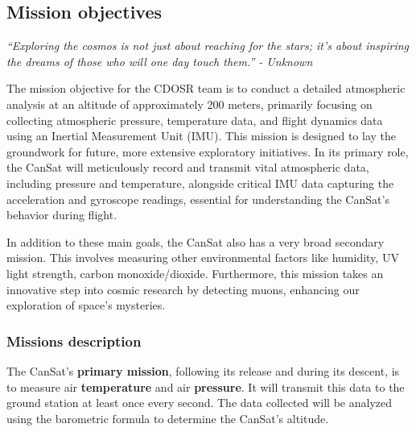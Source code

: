\subsection{Mission objectives}

{\textit{“Exploring the cosmos is not just about reaching for the stars; it's about inspiring the dreams of those who will one day touch them.” - Unknown}}
\vspace{0.5cm}

The mission objective for the CDOSR team is to conduct a detailed atmospheric analysis at an altitude of approximately 200 meters, primarily focusing on collecting atmospheric pressure, temperature data, and flight dynamics data using an Inertial Measurement Unit (IMU). This mission is designed to lay the groundwork for future, more extensive exploratory initiatives. In its primary role, the CanSat will meticulously record and transmit vital atmospheric data, including pressure and temperature, alongside critical IMU data capturing the acceleration and gyroscope readings, essential for understanding the CanSat's behavior during flight.

In addition to these main goals, the CanSat also has a very broad secondary mission. This involves measuring other environmental factors like humidity, UV light strength, carbon monoxide/dioxide. Furthermore, this mission takes an innovative step into cosmic research by detecting muons, enhancing our exploration of space's mysteries.

\subsubsection{Missions description}

The CanSat's \textbf{primary mission}, following its release and during its descent, is to measure air \textbf{temperature} and air \textbf{pressure}. It will transmit this data to the ground station at least once every second. The data collected will be analyzed using the barometric formula to determine the CanSat's altitude.


